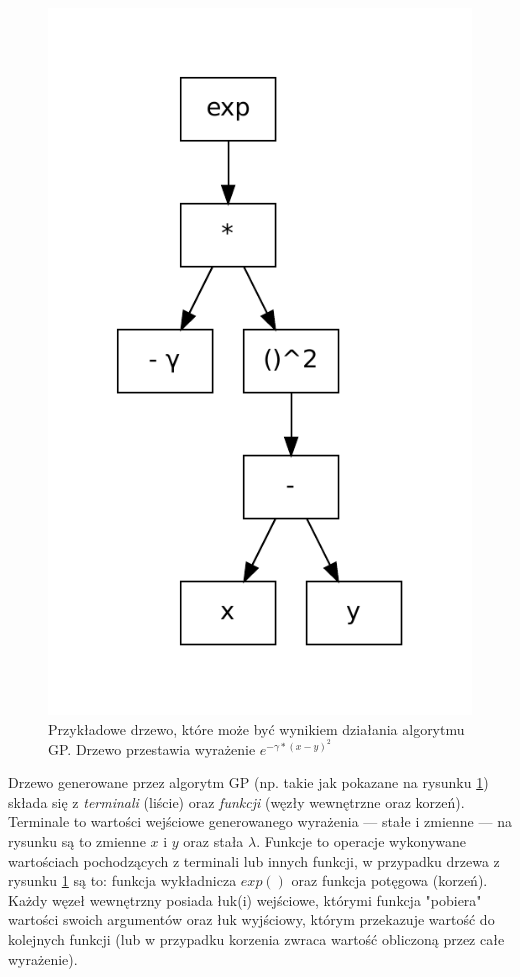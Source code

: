 \begin{figure}[h]
\centering
\includegraphics[scale=0.6]{figures/graphs/2-tree}
\caption{Przykładowe drzewo, które może być wynikiem działania algorytmu GP. Drzewo przestawia wyrażenie $ e^{-\gamma*(x-y)^2} $ \label{fig:2-tree}}
\end{figure}

Drzewo generowane przez algorytm GP (np. takie jak pokazane na rysunku \ref{fig:2-tree})  składa się z \emph{terminali} (liście) oraz \emph{funkcji} (węzły wewnętrzne oraz korzeń). Terminale to wartości wejściowe generowanego wyrażenia --- stałe i zmienne --- na rysunku są to zmienne $ x $ i $ y $ oraz stała $ \lambda $. Funkcje to operacje wykonywane wartościach pochodzących z terminali lub innych funkcji, w przypadku drzewa z rysunku \ref{fig:2-tree} są to: funkcja wykładnicza $ exp() $ oraz funkcja potęgowa (korzeń). Każdy węzeł wewnętrzny posiada łuk(i) wejściowe, którymi funkcja "pobiera" wartości swoich argumentów oraz łuk wyjściowy, którym przekazuje wartość do kolejnych funkcji (lub w przypadku korzenia zwraca wartość obliczoną przez całe wyrażenie).

